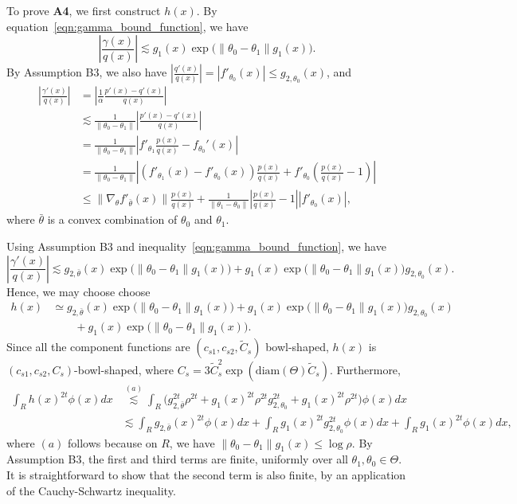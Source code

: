 \documentclass{article}
\begin{document}
To prove \textbf{A4}, we first construct $h(x)$. By equation~\ref{eqn:gamma_bound_function}, we have
\[
\left| \frac{\gamma(x)}{q(x)} \right| \lesssim
     g_1(x) \exp\Big( \|\theta_0 - \theta_1 \|  g_1(x) \Big).
\]
By Assumption B3, we also have $\left| \frac{q'(x)}{q(x)} \right| = |f'_{\theta_0}(x)| \leq g_{2, \theta_0}(x)$, and
\begin{align*}
\left| \frac{\gamma'(x) }{q(x)} \right| &=
    \left| \frac{1}{\alpha} \frac{p'(x) - q'(x)}{q(x)} \right| \\
%
&\lesssim \frac{1}{\| \theta_0 - \theta_1 \|}\left| \frac{p'(x) - q'(x)}{q(x)}\right|\\
%
& =  \frac{1}{\| \theta_0 - \theta_1 \|} \left|
           f'_{\theta_1} \frac{p(x)}{q(x)} - f_{\theta_0}'(x) \right| \\
  &= \frac{1}{\|\theta_0 - \theta_1\|} \left| 
          ( f'_{\theta_1}(x) - f'_{\theta_0}(x) ) \frac{p(x)}{q(x)} 
       + f'_{\theta_0} \left( \frac{p(x)}{q(x)} - 1 \right) \right| \\
  &\leq \| \nabla_{\theta} f'_{\bar{\theta}}(x) \| \frac{p(x)}{q(x)} 
         + \frac{1}{\| \theta_1 - \theta_0\|} 
        \left| \frac{p(x)}{q(x)} - 1 \right|  |f'_{\theta_0}(x)|,
\end{align*}
where $\bar{\theta}$ is a convex combination of $\theta_0$ and $\theta_1$. 

Using Assumption B3 and inequality~\eqref{eqn:gamma_bound_function}, we have
\[
\left| \frac{\gamma'(x)}{q(x)} \right| \lesssim 
      g_{2,\bar{\theta}}(x) \exp\Big( \| \theta_0 - \theta_1\| g_1(x) \Big)
      +  g_1(x) \exp\Big( \| \theta_0 - \theta_1 \| g_1(x) \Big) g_{2, \theta_0}(x).
\]
Hence, we may choose choose 
\begin{align*}
h(x) & \simeq g_{2,\bar{\theta}}(x) \exp\Big( \| \theta_0 - \theta_1\| g_1(x) \Big)
      +  g_1(x) \exp\Big( \| \theta_0 - \theta_1 \| g_1(x) \Big) g_{2, \theta_0}(x) \\
      & \qquad +  g_1(x) \exp\Big( \| \theta_0 - \theta_1 \| g_1(x) \Big).
\end{align*}
Since all the component functions are $(c_{s1}, c_{s2}, \tilde{C}_s)$ bowl-shaped, $h(x)$ is $(c_{s1}, c_{s2}, C_s)$-bowl-shaped, where 
$C_s = 3 \tilde{C}^2_s \exp( \textrm{diam}(\Theta) \tilde{C}_s)$. Furthermore,
\begin{align*}
\int_R h(x)^{2t} \phi(x) dx &\stackrel{(a)} \lesssim \int_R \Big( g_{2, \bar{\theta}}^{2t} \rho^{2t} + 
               g_1(x)^{2t} \rho^{2t} g_{2, \theta_0}^{2t} + g_1(x)^{2t} \rho^{2t}
              \Big) \phi(x) dx  \\
   & \lesssim \int_R  g_{2, \bar{\theta}}(x)^{2t} \phi(x) dx + 
        \int_R  g_1(x)^{2t} g_{2, \theta_0}^{2t} \phi(x) dx  + 
       \int_R g_1(x)^{2t} \phi(x) dx,
\end{align*}
where $(a)$ follows because on $R$, we have $\| \theta_0 - \theta_1 \| g_1(x) \leq \log \rho$. 
By Assumption B3, the first and third terms are finite, uniformly over all $\theta_1, \theta_0 \in \Theta$. It is straightforward to show that the second term is also finite, by an application of the Cauchy-Schwartz inequality.
\end{document}
